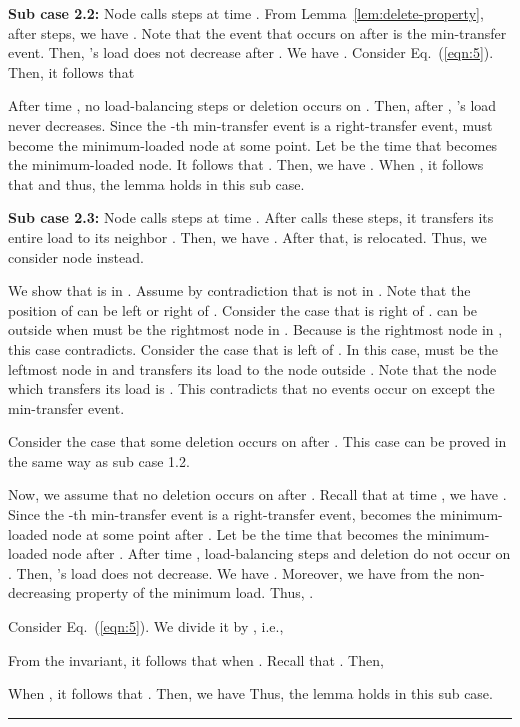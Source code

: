 \documentclass[a4paper]{article}
\newenvironment{proof}{{\bf Proof:}}{\hfill\rule{1.5mm}{3mm}\vspace{0.1in}}
\begin{document}
\begin{proof}
 \textbf{Sub case 2.2:} Node  calls {\splitnbr} steps at time
 . From Lemma~\ref{lem:delete-property}, after {\splitnbr}
 steps, we have .  Note that
 the event that occurs on  after  is the min-transfer
 event. Then, 's load does not decrease after . We have
 . Consider Eq.~(\ref{eqn:5}). Then, it follows that

  

  After time , no load-balancing steps or deletion occurs on .  Then,
 after , 's load never decreases.  Since the -th 
 min-transfer event is a right-transfer event,  must become the 
 minimum-loaded node at some point.  Let  be
 the time that  becomes the minimum-loaded node. 
 It follows that
 .  Then, we have
 . When
 , it follows that  and
 thus, the lemma holds in this sub case.

 \textbf{Sub case 2.3:} Node  calls {\splitmax} steps at time
 . After  calls these steps, it transfers its entire load
 to its neighbor . Then, we have . After
 that,  is relocated. Thus, we consider node  instead. 
 
 We show that  is in . Assume by contradiction that  is not in .
 Note that the position of  can be left or right of .
 Consider the case that  is right of .  can be outside  when 
  must be the rightmost node in . Because  is the rightmost node 
 in , this case contradicts. Consider the case that  is left of . 
 In this case,  must be the leftmost node in  and  transfers its load to the node
 outside . Note that the node which  transfers its load is .
 This contradicts that no events occur on  except the min-transfer event.
  
 Consider the case that some
 deletion occurs on  after . This case can be proved in the same
 way as sub case 1.2.

 Now, we assume  that no deletion occurs on  after
 .  Recall that at time , we have .  Since the -th
 min-transfer event is a right-transfer event,  becomes the
 minimum-loaded node at some point after . Let  be the time that 
 becomes the minimum-loaded node after .  After time
 , load-balancing steps and deletion do not occur on .  Then,
  's load does not decrease.  We have
 .  Moreover, we have
  from the non-decreasing property
 of the minimum load.  Thus, .

 Consider Eq.~(\ref{eqn:5}). We divide it by ,
 i.e.,  

 From the invariant, it follows that  when
 . Recall that .
 Then,


When , it follows that . Then, we
have  Thus,
the lemma holds in this sub case.
\end{proof}
\end{document}
